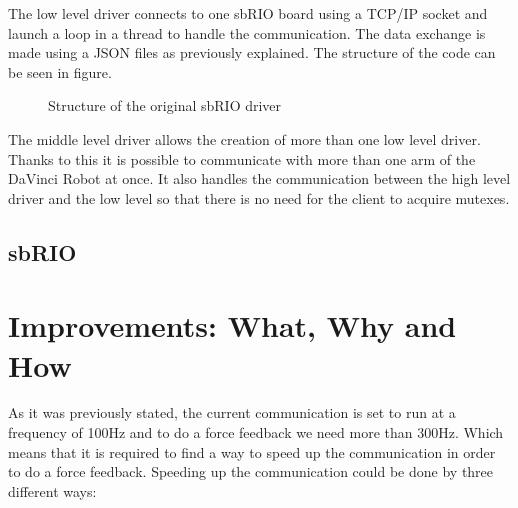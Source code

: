 The low level driver connects to one sbRIO board using a TCP/IP socket and launch a loop in a thread to handle the communication. The data exchange is made using a \gls{JSON} files as previously explained. The structure of the code can be seen in figure.

\begin{figure}[H]
\centering
{}
\caption{Structure of the original sbRIO driver}
\label{original_driver}
\end{figure}

The middle level driver allows the creation of more than one low level driver. Thanks to this it is possible to communicate with more than one arm of the DaVinci Robot at once. It also handles the communication between the high level driver and the low level so that there is no need for the client to acquire mutexes.


\subsection{sbRIO}

\section{Improvements: What, Why and How}

As it was previously stated, the current communication is set to run at a frequency of 100Hz and to do a force feedback we need more than 300Hz. Which means that it is required to find a way to speed up the communication in order to do a force feedback. Speeding up the communication could be done by three different ways:

